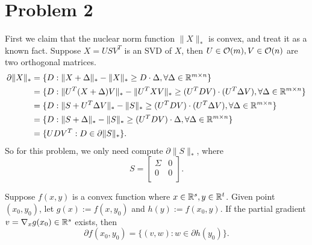 \section{Problem 2}

First we claim that the nuclear norm function $\|X\|_*$ is convex,
and treat it as a known fact.
Suppose $X=USV^T$ is an SVD of $X$,
then $U\in\mathcal{O}(m), V\in\mathcal{O}(n)$ are two orthogonal matrices.
\begin{equation}\label{eq:reduce}
\begin{split}
    \partial \|X\|_*
        &=\{D:\|X+\Delta\|_*-\|X\|_*\ge D\cdot\Delta, \forall\Delta\in{\mathbb{R}}^{m\times n}\} \\
        &=\{D:\|U^T(X+\Delta)V\|_*-\|U^TXV\|_*\ge (U^TDV)\cdot(U^T\Delta V), \forall\Delta\in{\mathbb{R}}^{m\times n}\} \\
        &=\{D:\|S+U^T\Delta V\|_*-\|S\|_*\ge (U^TDV)\cdot(U^T\Delta V), \forall\Delta\in{\mathbb{R}}^{m\times n}\} \\
        &=\{D:\|S+\Delta\|_*-\|S\|_*\ge (U^TDV)\cdot\Delta, \forall\Delta\in{\mathbb{R}}^{m\times n}\} \\
        &=\{UDV^T: D\in\partial \|S\|_*\}.
\end{split}
\end{equation}
So for this problem,
we only need compute $\partial\|S\|_*$,
where
\begin{equation}
    S=
    \begin{bmatrix}
        \Sigma  & 0 \\
        0       & 0 \\
    \end{bmatrix}.
\end{equation}
\begin{claim}\label{claim:1}
Suppose $f(x,y)$ is a convex function
where $x\in{\mathbb{R}}^s,y\in{\mathbb{R}}^t$.
Given point $(x_0,y_0)$,
let $g(x):=f(x,y_0)$ and $h(y):=f(x_0,y)$.
If the partial gradient $v=\nabla_x g(x_0)\in{\mathbb{R}}^s$ exists,
then
\begin{equation}
    \partial f(x_0,y_0) = \{(v,w):w\in\partial h(y_0)\}.
\end{equation}
\end{claim}
